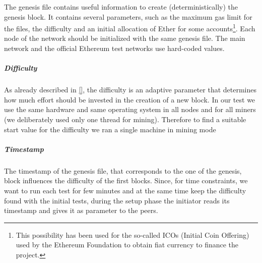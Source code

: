 The genesis file contains useful information to create (deterministically)
the genesis block. It contains several parameters, such as the maximum
gas limit for the files, the difficulty and an initial allocation of Ether
for some accounts\footnote{This possibility has been used for the so-called
ICOs (Initial Coin Offering) used by the Ethereum Foundation to obtain fiat
currency to finance the project.}. Each node of the network should be 
initialized with the same genesis file. 
The main network and the official Ethereum test
networks use hard-coded values.


\subparagraph{Difficulty}
As already described in \autoref{}, the difficulty is an adaptive parameter 
that determines how much effort should be invested in the creation of a new
block.
In our test we use the same hardware and same operating system in all nodes
and for all miners (we deliberately used only one thread for mining).
Therefore to find a suitable start value for the difficulty we ran a single
machine in mining mode 


\subparagraph{Timestamp}
The timestamp of the genesis file, that corresponds to the one of the genesis,
block influences the difficulty of the first blocks.
Since, for time constraints, we want to run each test for few minutes and
at the same time keep the difficulty found with the initial tests,
during the setup phase the initiator reads its timestamp and gives it
as parameter to the peers.


